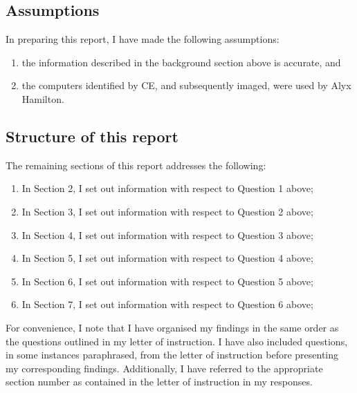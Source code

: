 
\subsection{Assumptions} %
\begin{myenum}
     
     \item In preparing this report, I have made the following assumptions:
         \begin{enumerate}
            \item the information described in the background section above is accurate, and 
            \item the computers identified by CE, and subsequently imaged, were used by Alyx Hamilton.
         \end{enumerate}
\end{myenum}
\label{sub:assumptions}


\subsection{Structure of this report} %
\begin{myenum}
     \item The remaining sections of this report addresses the following:
         \begin{enumerate}
            \item In Section 2, I set out information with respect to Question 1 above;
            \item In Section 3, I set out information with respect to Question 2 above;
            \item In Section 4, I set out information with respect to Question 3 above;
            \item In Section 5, I set out information with respect to Question 4 above;
            \item In Section 6, I set out information with respect to Question 5 above;
            \item In Section 7, I set out information with respect to Question 6 above;
         \end{enumerate}
     \item For convenience, I note that I have organised my findings in the same order as the questions outlined in my letter of instruction. I have also included questions, in some instances paraphrased, from the letter of instruction before presenting my corresponding findings. Additionally, I have referred to the appropriate section number as contained in the letter of instruction in my responses.
\end{myenum}
\label{sub:structure_of_this_report}



